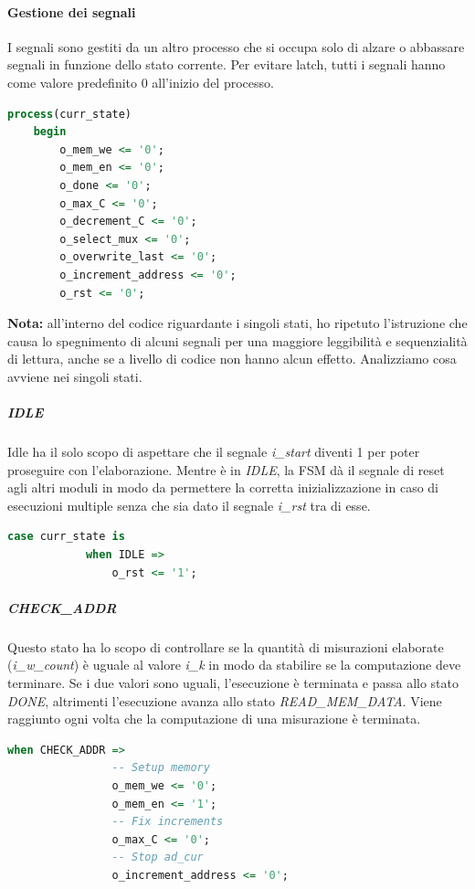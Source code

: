 \documentclass[12pt,a4paper]{scrartcl}
\begin{document}
            \paragraph{Gestione dei segnali} I segnali sono gestiti da un altro processo che si occupa solo di alzare o abbassare segnali in funzione dello stato corrente.
            \newline Per evitare latch, tutti i segnali hanno come valore predefinito 0 all'inizio del processo.
            \begin{lstlisting}[language=VHDL]
    process(curr_state)
    begin
        o_mem_we <= '0';
        o_mem_en <= '0';
        o_done <= '0';
        o_max_C <= '0';
        o_decrement_C <= '0';
        o_select_mux <= '0';
        o_overwrite_last <= '0';
        o_increment_address <= '0';
        o_rst <= '0';
            \end{lstlisting}
            \textbf{Nota:} all'interno del codice riguardante i singoli stati, ho ripetuto l'istruzione che causa lo spegnimento di alcuni segnali per una maggiore leggibilità e sequenzialità di lettura, anche se a livello di codice non hanno alcun effetto. 
            \newline \newline Analizziamo cosa avviene nei singoli stati.
            \subparagraph{IDLE} Idle ha il solo scopo di aspettare che il segnale \textit{i\_start} diventi 1 per poter proseguire con l'elaborazione. Mentre è in \textit{IDLE}, la FSM dà il segnale di reset agli altri moduli in modo da permettere la corretta inizializzazione in caso di esecuzioni multiple senza che sia dato il segnale \textit{i\_rst} tra di esse.
                \begin{lstlisting}[language=VHDL]
        case curr_state is
            when IDLE =>
                o_rst <= '1';
                \end{lstlisting}
            \subparagraph{CHECK\_ADDR} Questo stato ha lo scopo di controllare se la quantità di misurazioni elaborate (\textit{i\_w\_count}) è uguale al valore \textit{i\_k} in modo da stabilire se la computazione deve terminare. Se i due valori sono uguali, l'esecuzione è terminata e passa allo stato \textit{DONE}, altrimenti l'esecuzione avanza allo stato \textit{READ\_MEM\_DATA}.
                \newline Viene raggiunto ogni volta che la computazione di una misurazione è terminata.
                \begin{lstlisting}[language=VHDL]
            when CHECK_ADDR =>
                -- Setup memory
                o_mem_we <= '0';
                o_mem_en <= '1';
                -- Fix increments
                o_max_C <= '0';
                -- Stop ad_cur
                o_increment_address <= '0';
                \end{lstlisting}
\end{document}
